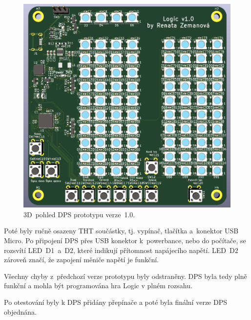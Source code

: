   \begin{figure}[!h]
    \begin{center}
      \includegraphics[scale=0.65]{obrazky/Verze1_3D_pohled.png}
    \end{center}
    \caption[3D~pohled DPS prototypu verze~1.0]{3D~pohled DPS prototypu verze~1.0.}
  \end{figure}

  Poté byly ručně osazeny THT součástky, tj. vypínač, tlačítka a~konektor USB Micro. Po připojení DPS přes USB konektor k~powerbance, 
  nebo do počítače, se rozsvítí LED~D1~a~D2, které indikují přítomnost napájecího napětí. LED~D2 zároveň značí, že zapojení měniče
  napětí je funkční.

  Všechny chyby z~předchozí verze prototypu byly odstraněny. DPS byla tedy plně funkční a mohla být programována hra Logic v plném rozsahu.
  
  Po otestování byly k DPS přidány přepínače a poté byla finální verze DPS objednána.

  

 
  





